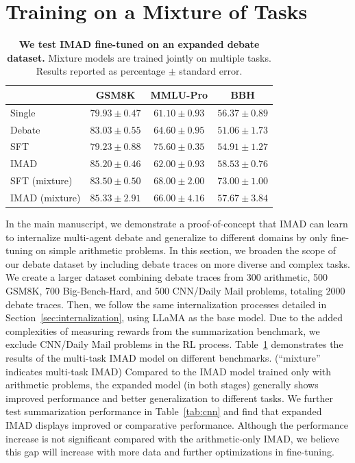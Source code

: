 \section{Training on a Mixture of Tasks}\label{sec:mixture}
\begin{table}[h]
    \centering
    \caption{\textbf{We test IMAD fine-tuned on an expanded debate dataset.} Mixture models are trained jointly on multiple tasks. Results reported as percentage $\pm$ standard error.}
    \label{tab:combined}
    \begin{tabular}{lccc}
        \toprule
        & GSM8K & MMLU-Pro & BBH \\
        \midrule
        \quad Single & $79.93 \pm 0.47$ & $61.10 \pm 0.93$ & $56.37 \pm 0.89$ \\
        \quad Debate & $83.03 \pm 0.55$ & $64.60 \pm 0.95$ & $51.06 \pm 1.73$ \\
        \quad SFT    & $79.23 \pm 0.88$ & $\mathbf{75.60} \pm \mathbf{0.35}$ & $54.91 \pm 1.27$ \\
        \quad IMAD   & $85.20 \pm 0.46$ & $62.00 \pm 0.93$ & $58.53 \pm 0.76$ \\
        \quad SFT (mixture)  & $83.50 \pm 0.50$ & $68.00 \pm 2.00$ & $\mathbf{73.00} \pm \mathbf{1.00}$ \\
        \quad IMAD (mixture) & $\mathbf{85.33} \pm \mathbf{2.91}$ & $66.00 \pm 4.16$ & $57.67 \pm 3.84$ \\
        \bottomrule
    \end{tabular}
\end{table}
In the main manuscript, we demonstrate a proof-of-concept that IMAD can learn to internalize multi-agent debate and generalize to different domains by only fine-tuning on simple arithmetic problems. 
In this section, we broaden the scope of our debate dataset by including debate traces on more diverse and complex tasks. 
We create a larger dataset combining debate traces from 300 arithmetic, 500 GSM8K, 700 Big-Bench-Hard, and 500 CNN/Daily Mail problems, totaling 2000 debate traces. 
Then, we follow the same internalization processes detailed in Section~\ref{sec:internalization}, using LLaMA as the base model.
Due to the added complexities of measuring rewards from the summarization benchmark, we exclude CNN/Daily Mail problems in the RL process. 
Table~\ref{tab:combined} demonstrates the results of the multi-task IMAD model on different benchmarks. (``mixture'' indicates multi-task IMAD)
Compared to the IMAD model trained only with arithmetic problems, the expanded model (in both stages) generally shows improved performance and better generalization to different tasks. 
We further test summarization performance in Table~\ref{tab:cnn} and find that expanded IMAD displays improved or comparative performance. 
Although the performance increase is not significant compared with the arithmetic-only IMAD, we believe this gap will increase with more data and further optimizations in fine-tuning. 

